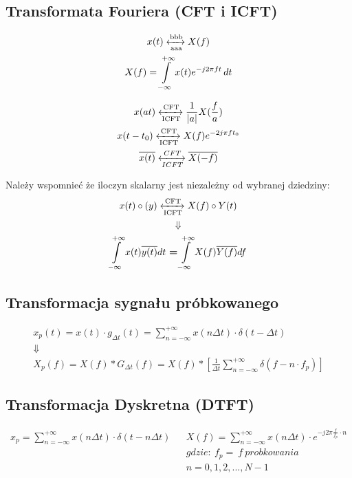     \subsection{Transformata Fouriera (CFT i ICFT)}
        \begin{multicols}{2}
            \begin{gather*}
                x(t) \xleftrightarrow[\text{aaa}]{\text{bbb}} X(f)\\
                X(f) = \int\limits_{-\infty}^{+\infty} x(t) e^{-j2\pi f t}  \,dt 
            \end{gather*}

            \begin{gather*}
                x(a t)\xleftrightarrow[\text{ICFT}]{\text{CFT}} \frac{1}{|a|} X(\frac{f}{a})\\
                x(t - t_0)\xleftrightarrow[\text{ICFT}]{\text{CFT}} X(f)e^{-2j\pi ft_0}\\
                \overline{x(t)} \xleftrightarrow[ICFT]{CFT} \overline{X(-f)}
            \end{gather*}
        \end{multicols}
        Należy wspomnieć że iloczyn skalarny jest niezależny od wybranej dziedziny:
        \begin{gather*}
            x(t)\circ(y) \xleftrightarrow[\text{ICFT}]{\text{CFT}} X(f) \circ Y(t)\\
            \Downarrow\\
            \int\limits^{+\infty}_{-\infty}x(t)\overline{y(t)} dt \ \textbf{=} \int\limits^{+\infty}_{-\infty}X(f)\overline{Y(f)}df
        \end{gather*}

    \subsection{Transformacja sygnału próbkowanego}
        \begin{gather*}
            x_p(t) = x(t)\cdot g_{\Delta t}(t) = \sum_{n=-\infty}^{+\infty}x(n\Delta t)\cdot\delta(t-\Delta t)\\
            \Downarrow\\
            X_p(f) = X(f) * G_{\Delta t}(f) = X(f) * \left[\frac{1}{\Delta t} \sum_{n=-\infty}^{+\infty}\delta(f-n\cdot f_p)\right]
        \end{gather*}

    \subsection{Transformacja Dyskretna (DTFT)}
        \begin{align*}
                x_p = \sum\limits_{n=-\infty}^{+\infty}x(n\Delta t)\cdot \delta(t-n\Delta t) &&
%
                X(f) = \sum\limits_{n = -\infty}^{+\infty}x(n\Delta t) \cdot e^{-j2 \pi \frac{f}{f_{p}}\cdot n}\\
                &&gdzie:\ f_p =\ f\ probkowania\\
                &&n = 0, 1, 2, ..., N-1
        \end{align*}

